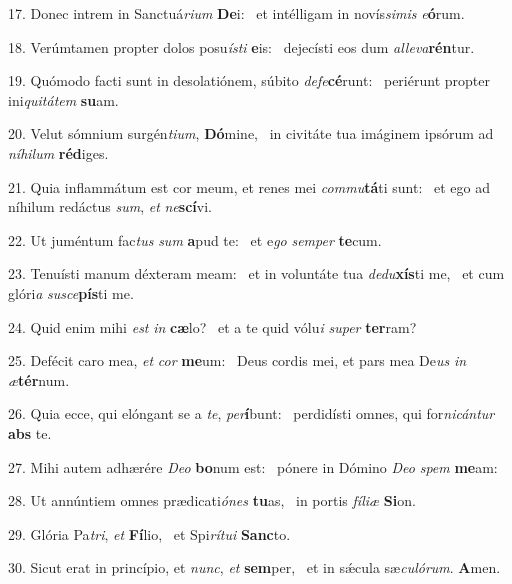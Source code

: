 17. Donec intrem in Sanctuá\textit{ri}\textit{um} \textbf{De}i: \ast\  et intélligam in novís\textit{si}\textit{mis} \textit{e}\textbf{ó}rum.\

18. Verúmtamen propter dolos posu\textit{ís}\textit{ti} \textbf{e}is: \ast\  dejecísti eos dum \textit{al}\textit{le}\textit{va}\textbf{rén}tur.\

19. Quómodo facti sunt in desolatiónem, súbito \textit{de}\textit{fe}\textbf{cé}runt: \ast\  periérunt propter ini\textit{qui}\textit{tá}\textit{tem} \textbf{su}am.\

20. Velut sómnium surgén\textit{ti}\textit{um}, \textbf{Dó}mine, \ast\  in civitáte tua imáginem ipsórum ad \textit{ní}\textit{hi}\textit{lum} \textbf{réd}iges.\

21. Quia inflammátum est cor meum, et renes mei \textit{com}\textit{mu}\textbf{tá}ti sunt: \ast\  et ego ad níhilum redáctus \textit{sum}, \textit{et} \textit{ne}\textbf{scí}vi.\

22. Ut juméntum fac\textit{tus} \textit{sum} \textbf{a}pud te: \ast\  et e\textit{go} \textit{sem}\textit{per} \textbf{te}cum.\

23. Tenuísti manum déxteram meam: \dag\  et in voluntáte tua \textit{de}\textit{du}\textbf{xís}ti me, \ast\  et cum glóri\textit{a} \textit{su}\textit{sce}\textbf{pís}ti me.\

24. Quid enim mihi \textit{est} \textit{in} \textbf{cæ}lo? \ast\  et a te quid vólu\textit{i} \textit{su}\textit{per} \textbf{ter}ram?\

25. Defécit caro mea, \textit{et} \textit{cor} \textbf{me}um: \ast\  Deus cordis mei, et pars mea De\textit{us} \textit{in} \textit{æ}\textbf{tér}num.\

26. Quia ecce, qui elóngant se a \textit{te}, \textit{per}\textbf{í}bunt: \ast\  perdidísti omnes, qui for\textit{ni}\textit{cán}\textit{tur} \textbf{abs} te.\

27. Mihi autem adhærére \textit{De}\textit{o} \textbf{bo}num est: \ast\  pónere in Dómino \textit{De}\textit{o} \textit{spem} \textbf{me}am:\

28. Ut annúntiem omnes prædicati\textit{ó}\textit{nes} \textbf{tu}as, \ast\  in portis \textit{fí}\textit{li}\textit{æ} \textbf{Si}on.\

29. Glória Pa\textit{tri}, \textit{et} \textbf{Fí}lio, \ast\  et Spi\textit{rí}\textit{tu}\textit{i} \textbf{Sanc}to.\

30. Sicut erat in princípio, et \textit{nunc}, \textit{et} \textbf{sem}per, \ast\  et in sǽcula sæ\textit{cu}\textit{ló}\textit{rum}. \textbf{A}men.\

